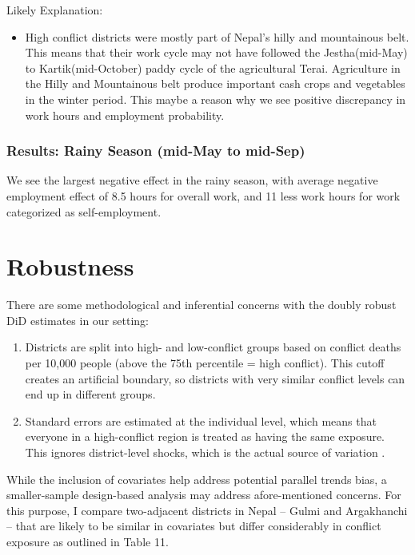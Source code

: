 \documentclass[12pt,a4paper]{article}
\begin{document}
Likely Explanation:
\begin{itemize}
	\item High conflict districts were mostly part of Nepal's hilly and mountainous belt. This means that their work cycle may not have followed the Jestha(mid-May) to Kartik(mid-October) paddy cycle of the agricultural Terai. Agriculture in the Hilly and Mountainous belt produce important cash crops and vegetables in the winter period. This maybe a reason why we see positive discrepancy in work hours and employment probability. 
\end{itemize}


\subsubsection{Results: Rainy Season (mid-May to mid-Sep)}


We see the largest negative effect in the rainy season, with average negative employment effect of 8.5 hours for overall work, and 11 less work hours for work categorized as self-employment.




\section{Robustness}
There are some methodological and inferential concerns with the doubly robust DiD estimates in our setting:

\begin{enumerate}
	\item Districts are split into high- and low-conflict groups based on conflict deaths per 10,000 people (above the 75th percentile = high conflict). This cutoff creates an artificial boundary, so districts with very similar conflict levels can end up in different groups.
	\item Standard errors are estimated at the individual level, which means that everyone in a high-conflict region is treated as having the same exposure. This ignores district-level shocks, which is the actual source of variation \parencite{bertrand2004much}.
\end{enumerate}
While the inclusion of covariates help address potential parallel trends bias, a smaller-sample design-based analysis may address afore-mentioned concerns. For this purpose, I compare two-adjacent districts in Nepal -- Gulmi and Argakhanchi -- that are likely to be similar in covariates but differ considerably in conflict exposure as outlined in Table 11.
\end{document}
